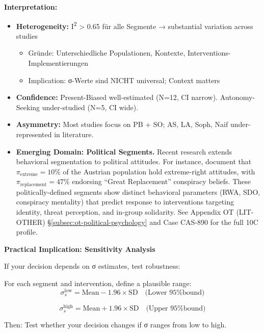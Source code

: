 \textbf{Interpretation:}
\begin{itemize}[nosep]
\item \textbf{Heterogeneity:} I\textsuperscript{2} > 0.65 für alle Segmente → substantial variation across studies
  \begin{itemize}[nosep]
  \item Gründe: Unterschiedliche Populationen, Kontexte, Interventions-Implementierungen
  \item Implication: σ-Werte sind NICHT universal; Context matters
  \end{itemize}

\item \textbf{Confidence:} Present-Biased well-estimated (N=12, CI narrow). Autonomy-Seeking under-studied (N=5, CI wide).

\item \textbf{Asymmetry:} Most studies focus on PB + SO; AS, LA, Soph, Naif under-represented in literature.

\item \textbf{Emerging Domain: Political Segments.} Recent research extends behavioral segmentation to political attitudes. For instance, \citet{PAP-doew2024rechtsextremismus} document that $\pi_{\text{extreme}} = 10\%$ of the Austrian population hold extreme-right attitudes, with $\pi_{\text{replacement}} = 47\%$ endorsing ``Great Replacement'' conspiracy beliefs. These politically-defined segments show distinct behavioral parameters (RWA, SDO, conspiracy mentality) that predict response to interventions targeting identity, threat perception, and in-group solidarity. See Appendix OT (LIT-OTHER) §\ref{subsec:ot-political-psychology} and Case CAS-890 for the full 10C profile.
\end{itemize}

\textbf{Practical Implication: Sensitivity Analysis}

If your decision depends on σ estimates, test robustness:

\begin{definition}
\label{def:19-sensitivity}

For each segment and intervention, define a plausible range:
\begin{equation}
\sigma_s^{\text{low}} = \text{Mean} - 1.96 \times \text{SD}
\quad \text{(Lower 95\% bound)}
\end{equation}

\begin{equation}
\sigma_s^{\text{high}} = \text{Mean} + 1.96 \times \text{SD}
\quad \text{(Upper 95\% bound)}
\end{equation}

Then: Test whether your decision changes if σ ranges from low to high.

\end{definition}

